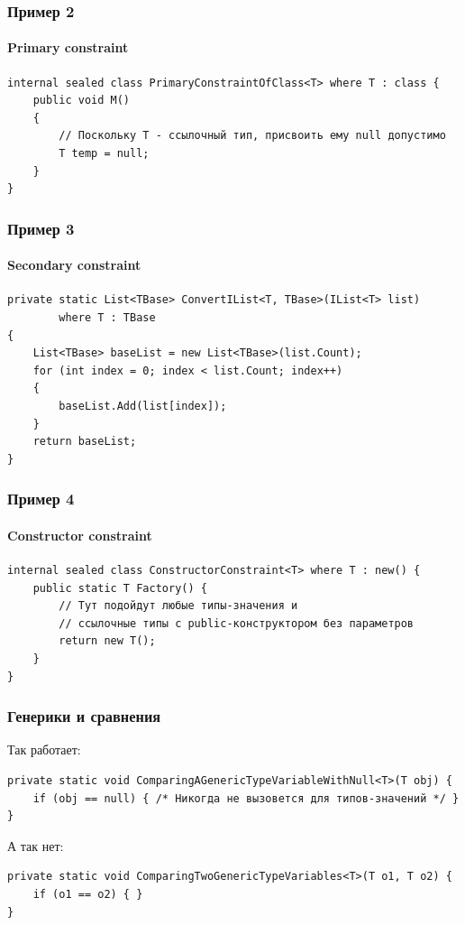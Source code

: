 \documentclass[xetex,mathserif,serif]{beamer}
\begin{document}
	\begin{frame}[fragile]
		\frametitle{Пример 2}
		\framesubtitle{Primary constraint}
		\begin{footnotesize}
			\begin{verbatim}
internal sealed class PrimaryConstraintOfClass<T> where T : class {
    public void M() 
    {
        // Поскольку T - ссылочный тип, присвоить ему null допустимо
        T temp = null;
    }
}
			\end{verbatim}
		\end{footnotesize}
	\end{frame}

	\begin{frame}[fragile]
		\frametitle{Пример 3}
		\framesubtitle{Secondary constraint}
		\begin{footnotesize}
			\begin{verbatim}
private static List<TBase> ConvertIList<T, TBase>(IList<T> list)
        where T : TBase 
{
    List<TBase> baseList = new List<TBase>(list.Count);
    for (int index = 0; index < list.Count; index++) 
    {
        baseList.Add(list[index]);
    }
    return baseList;
}
			\end{verbatim}
		\end{footnotesize}
	\end{frame}

	\begin{frame}[fragile]
		\frametitle{Пример 4}
		\framesubtitle{Constructor constraint}
		\begin{footnotesize}
			\begin{verbatim}
internal sealed class ConstructorConstraint<T> where T : new() {
    public static T Factory() {
        // Тут подойдут любые типы-значения и 
        // ссылочные типы с public-конструктором без параметров
        return new T();
    }
}
			\end{verbatim}
		\end{footnotesize}
	\end{frame}

	\begin{frame}[fragile]
		\frametitle{Генерики и сравнения}
		Так работает:
		\begin{footnotesize}
			\begin{verbatim}
private static void ComparingAGenericTypeVariableWithNull<T>(T obj) {
    if (obj == null) { /* Никогда не вызовется для типов-значений */ }
}
			\end{verbatim}
		\end{footnotesize}
		\vspace{5mm}
		А так нет:
		\begin{footnotesize}
			\begin{verbatim}
private static void ComparingTwoGenericTypeVariables<T>(T o1, T o2) {
    if (o1 == o2) { }
}
			\end{verbatim}
		\end{footnotesize}
	\end{frame}
\end{document}
